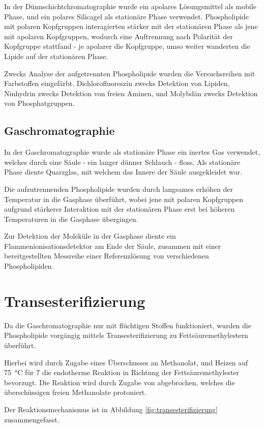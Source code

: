 \documentclass[a4paper,english]{scrreprt}
\begin{document}
In der Dünnschichtchromatographie wurde ein apolares Lösungsmittel als mobile
Phase, und ein polares Silicagel als stationäre Phase verwendet. Phospholipide
mit polaren Kopfgruppen interagierten stärker mit der stationären Phase als
jene mit apolaren Kopfgruppen, wodurch eine Auftrennung nach Polarität der
Kopfgruppe stattfand - je apolarer die Kopfgruppe, umso weiter wanderten die
Lipide auf der stationären Phase.

Zwecks Analyse der aufgetrennten Phospholipide wurden die Versuchsreihen mit
Farbstoffen eingefärbt. Dichlorofluoreszin zwecks Detektion von Lipiden,
Ninhydrin zwecks Detektion von freien Aminen, und Molybdän zwecks Detektion
von Phosphatgruppen.

\subsection{Gaschromatographie}

In der Gaschromatographie wurde als stationäre Phase ein inertes Gas verwendet,
welches durch eine Säule - ein langer dünner Schlauch - floss. Als stationäre
Phase diente Quarzglas, mit welchem das Innere der Säule ausgekleidet war.

Die aufzutrennenden Phospholipide wurden durch langsames erhöhen der Temperatur
in die Gasphase überführt, wobei jene mit polaren Kopfgruppen aufgrund stärkerer
Interaktion mit der stationären Phase erst bei höheren Temperaturen in die
Gasphase übergingen.

Zur Detektion der Moleküle in der Gasphase diente ein
Flammenionisationsdetektor am Ende der Säule, zusammen mit einer
bereitgestellten Messreihe einer Referenzlösung von verschiedenen
Phospholipiden.

\section{Transesterifizierung}

Da die Gaschromatographie nur mit flüchtigen Stoffen funktioniert, wurden die
Phospholipide vorgängig mittels Transesterifizierung zu Fettsäuremethylestern
überführt. \cite{handoutv11}

Hierbei wird durch Zugabe eines Überschusses an Methanolat, und Heizen auf
\SI{75}{\celsius} für \SI{7}{\min} die endotherme Reaktion in Richtung der
Fettsäuremethylester bevorzugt. Die Reaktion wird durch Zugabe von 
abgebrochen, welches die überschüssigen freien Methanolate protoniert.

Der Reaktionsmechanismus ist in Abbildung \ref{fig:transesterifizierung}
zusammengefasst.
\end{document}
